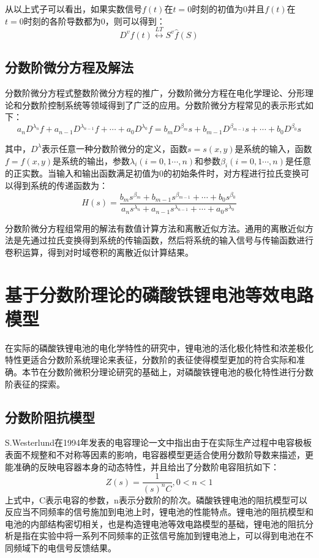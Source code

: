 从以上式子可以看出，如果实数信号$f(t)$在$t=0$时刻的初值为0并且$f(t)$在$t=0$时刻的各阶导数都为0，则可以得到：
\begin{equation}
{{D}^{v}}f(t)\overset{LT}{\longleftrightarrow}{{S}^{v}}\widehat{f}\left( S \right)
\end{equation}
\subsection{分数阶微分方程及解法}
分数阶微分方程式整数阶微分方程的推广，分数阶微分方程在电化学理论、分形理论和分数阶控制系统等领域得到了广泛的应用。分数阶微分方程常见的表示形式如下：
\begin{equation}
{{a}_{n}}{{D}^{{{\lambda }_{n}}}}f+{{a}_{n-1}}{{D}^{{{\lambda }_{n-1}}}}f+\cdots +{{a}_{0}}{{D}^{{{\lambda }_{0}}}}f={{b}_{m}}{{D}^{{{\beta }_{m}}}}s+{{b}_{m-1}}{{D}^{{{\beta }_{m-1}}}}s+\cdots +{{b}_{0}}{{D}^{{{\beta }_{0}}}}s
\end{equation}

其中，${{D}^{\lambda }}$表示任意一种分数阶微分的定义，函数$s=s\left( x,y \right)$是系统的输入，函数$f=f\left( x,y \right)$是系统的输出，参数${{\lambda }_{i}}\left( i=0,1\cdots ,n \right)$和参数${{\beta }_{i}}\left( i=0,1\cdots ,n \right)$是任意的正实数。当输入和输出函数满足初值为0的初始条件时，对方程进行拉氏变换可以得到系统的传递函数为：
\begin{equation}
H\left( s \right)=\frac{{{b}_{m}}{{s}^{{{\beta }_{m}}}}+{{b}_{m-1}}{{s}^{{{\beta }_{m-1}}}}+\cdots +{{b}_{0}}{{s}^{{{\beta }_{0}}}}}{{{a}_{n}}{{s}^{{{\lambda }_{n}}}}+{{a}_{n-1}}{{s}^{{{\lambda }_{n-1}}}}+\cdots +{{a}_{0}}{{s}^{{{\lambda }_{0}}}}}
\end{equation}

分数阶微分方程组常用的解法有数值计算方法和离散近似方法。通用的离散近似方法是先通过拉氏变换得到系统的传输函数，然后将系统的输入信号与传输函数进行卷积运算，得到对时域卷积的离散近似计算结果。
\section{基于分数阶理论的磷酸铁锂电池等效电路模型}
在实际的磷酸铁锂电池的电化学特性的研究中，锂电池的活化极化特性和浓差极化特性更适合分数阶系统理论来表征，分数阶的表征使得模型更加的符合实际和准确。本节在分数阶微积分理论研究的基础上，对磷酸铁锂电池的极化特性进行分数阶表征的探索。
\subsection{分数阶阻抗模型}
S.Westerlund在1994年发表的电容理论一文中指出由于在实际生产过程中电容极板表面不规整和不对称等因素的影响，电容器模型更适合使用分数阶导数来描述，更能准确的反映电容器本身的动态特性，并且给出了分数阶电容阻抗如下：
\begin{equation}
Z\left( s \right)=\frac{1}{{{\left( s \right)}^{n}}C},0<n<1
\end{equation}
上式中，C表示电容的参数，n表示分数阶的阶次。磷酸铁锂电池的阻抗模型可以反应当不同频率的信号施加到电池上时，锂电池的性能特点。锂电池的阻抗模型和电池的内部结构密切相关，也是构造锂电池等效电路模型的基础，锂电池的阻抗分析是指在实验中将一系列不同频率的正弦信号施加到锂电池上，可以得到电池在不同频域下的电信号反馈结果。

